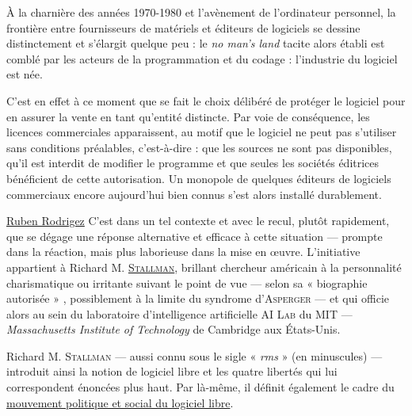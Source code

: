À la charnière des années 1970-1980 et l'avènement de l'ordinateur personnel, la frontière entre fournisseurs de matériels et éditeurs de logiciels se dessine distinctement et s'élargit quelque peu : le \textit{no man's land} tacite alors établi est comblé par les acteurs de la programmation et du codage : l'industrie du logiciel est née. 

C'est en effet à ce moment que se fait le choix délibéré de protéger le logiciel pour en assurer la vente en tant qu'entité distincte. Par voie de conséquence, les licences commerciales apparaissent, au motif que le logiciel ne peut pas s'utiliser sans conditions préalables, c'est-à-dire : que les sources ne sont pas disponibles, qu'il est interdit de modifier le programme et que seules les sociétés éditrices bénéficient de cette autorisation. Un monopole de quelques éditeurs de logiciels commerciaux encore aujourd'hui bien connus s'est alors installé durablement.%

%
{\href{https://creativecommons.org/licenses/by/4.0/}{\ccby} \href{https://media.libreplanet.org/u/libreplanet/m/richard-stallman-at-libreplanet-2019-2113/}{Ruben Rodrigez}}%
C'est dans un tel contexte et avec le recul, plutôt rapidement, que se dégage une réponse alternative et efficace à cette situation --- prompte dans la réaction, mais plus laborieuse dans la mise en œuvre. L'initiative appartient à Richard M. \href{http://stallman.org/}{\textsc{Stallman}}, brillant chercheur américain à la personnalité charismatique ou irritante suivant le point de vue --- selon sa « biographie autorisée » \parencite{Stallman-Williams-Massutti:2010}, possiblement à la limite du syndrome d'\textsc{Asperger} --- et qui officie alors au sein du laboratoire d'intelligence artificielle \textsc{AI Lab} du MIT --- \textit{Massachusetts Institute of Technology} de Cambridge aux États-Unis.

Richard M. \textsc{Stallman} --- aussi connu sous le sigle « \textit{rms} » (en minuscules) --- introduit ainsi la notion de logiciel libre et les quatre libertés qui lui correspondent énoncées plus haut. Par là-même, il définit également le cadre du \href{https://fr.wikipedia.org/wiki/Mouvement_du_logiciel_libre}{mouvement politique et social du logiciel libre}.

